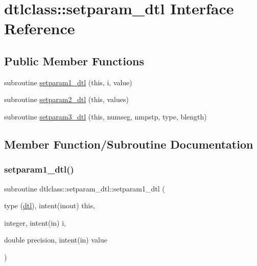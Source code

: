 \hypertarget{interfacedtlclass_1_1setparam__dtl}{}\section{dtlclass\+::setparam\+\_\+dtl Interface Reference}
\label{interfacedtlclass_1_1setparam__dtl}
\subsection*{Public Member Functions}
\begin{DoxyCompactItemize}
\item 
subroutine \mbox{\hyperlink{interfacedtlclass_1_1setparam__dtl_a7f726d003eb3c7edca2b20e77ce0ce85}{setparam1\+\_\+dtl}} (this, i, value)
\item 
subroutine \mbox{\hyperlink{interfacedtlclass_1_1setparam__dtl_a270334a3ecb86adef07d3d58ff9b2d07}{setparam2\+\_\+dtl}} (this, values)
\item 
subroutine \mbox{\hyperlink{interfacedtlclass_1_1setparam__dtl_addbf0daa267c5e8ed241d8a86460f315}{setparam3\+\_\+dtl}} (this, numseg, nmpstp, type, blength)
\end{DoxyCompactItemize}


\subsection{Member Function/\+Subroutine Documentation}
\mbox{\label{interfacedtlclass_1_1setparam__dtl_a7f726d003eb3c7edca2b20e77ce0ce85}} 
\subsubsection{\texorpdfstring{setparam1\_dtl()}{setparam1\_dtl()}}
{\footnotesize\ttfamily subroutine dtlclass\+::setparam\+\_\+dtl\+::setparam1\+\_\+dtl (\begin{DoxyParamCaption}\item[{type (\mbox{\hyperlink{namespacedtlclass_structdtlclass_1_1dtl}{dtl}}), intent(inout)}]{this,  }\item[{integer, intent(in)}]{i,  }\item[{double precision, intent(in)}]{value }\end{DoxyParamCaption})}

